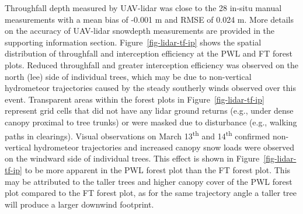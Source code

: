 \documentclass[
  letterpaper,
  DIV=11,
  numbers=noendperiod]{scrartcl}
\begin{document}
Throughfall depth measured by UAV-lidar was close to the 28 in-situ
manual measurements with a mean bias of -0.001 m and RMSE of 0.024 m.
More details on the accuracy of UAV-lidar snowdepth measurements are
provided in the supporting information section.
Figure~\ref{fig-lidar-tf-ip} shows the spatial distribution of
throughfall and interception efficiency at the PWL and FT forest plots.
Reduced throughfall and greater interception efficiency was observed on
the north (lee) side of individual trees, which may be due to
non-vertical hydrometeor trajectories caused by the steady southerly
winds observed over this event. Transparent areas within the forest
plots in Figure~\ref{fig-lidar-tf-ip} represent grid cells that did not
have any lidar ground returns (e.g., under dense canopy proximal to tree
trunks) or were masked due to disturbance (e.g., walking paths in
clearings). Visual observations on March 13\textsuperscript{th} and
14\textsuperscript{th} confirmed non-vertical hydrometeor trajectories
and increased canopy snow loads were observed on the windward side of
individual trees. This effect is shown in Figure~\ref{fig-lidar-tf-ip}
to be more apparent in the PWL forest plot than the FT forest plot. This
may be attributed to the taller trees and higher canopy cover of the PWL
forest plot compared to the FT forest plot, as for the same trajectory
angle a taller tree will produce a larger downwind footprint.
\end{document}
